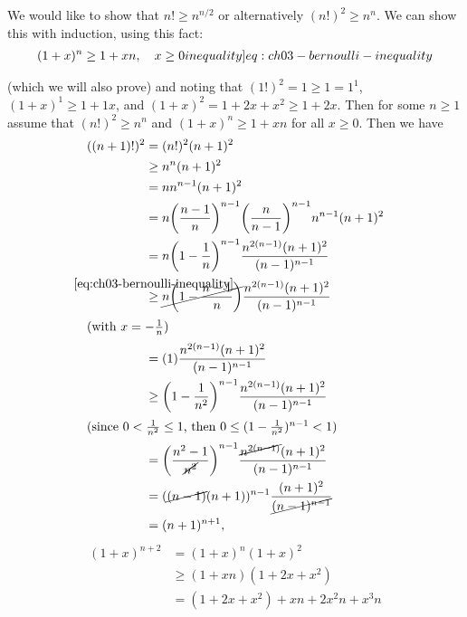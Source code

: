 \documentclass[Chapter03]{subfiles}
\begin{document}
\begin{enumerate}
\begin{answer}
			We would like to show that $n! \geq n^{n/2}$ or alternatively $(n!)^2 \geq n^n$. We can show this with induction, using this fact:
			\begin{align}
				(1 + x)^n \geq 1 + xn,\quad x \geq 0 \label[inequality]{eq:ch03-bernoulli-inequality}
			\end{align}

			  (which we will also prove) and noting that $(1!)^2 = 1 \geq 1 = 1^1$, $(1 + x)^1 \geq 1 + 1x$, and $(1 + x)^2 = 1 + 2x + x^2 \geq 1 + 2x$. Then for some $n \geq 1$ assume that $(n!)^2 \geq n^n$ and $(1 + x)^n \geq 1 + xn$ for all $x \geq 0$. Then we have
			\begin{align*}
				((n + 1)!)^2 &= (n!)^2 (n+1)^2\\
					&\geq n^n (n + 1)^2\\
					&= n n^{n - 1}(n + 1)^2\\
					&= n \qty(\frac{n - 1}{n})^{n - 1} \qty(\frac{n}{n - 1})^{n - 1} n^{n - 1}(n + 1)^2\\
					&= n \qty(1 - \frac{1}{n})^{n - 1} \frac{n^{2(n - 1)}(n + 1)^2}{(n - 1)^{n - 1}}\\
					&\overset{\mathclap{\eqref{eq:ch03-bernoulli-inequality}}}{\geq} \cancel{n \qty(1 - \frac{n - 1}{n})} \frac{n^{2(n - 1)}(n + 1)^2}{(n - 1)^{n - 1}}\\
				\shortintertext{(with $x = -\frac{1}{n}$)}
					&= (1) \frac{n^{2(n - 1)}(n + 1)^2}{(n - 1)^{n - 1}}\\
					&\geq \qty (1 - \frac{1}{n^2})^{n - 1} \frac{n^{2(n - 1)}(n + 1)^2}{(n - 1)^{n - 1}}\\
				\shortintertext{(since $0 < \frac{1}{n^2} \leq 1$, then $0 \leq (1 - \frac{1}{n^2})^{n - 1} < 1$)}
					&= \qty(\frac{n^2 - 1}{\cancel{n^2}})^{n - 1} \frac{\cancel{n^{2(n - 1)}}(n + 1)^2}{(n - 1)^{n - 1}}\\
					&= (\cancel{(n-1)}(n+1))^{n - 1} \frac{(n + 1)^2}{\cancel{(n - 1)^{n - 1}}}\\
					&= (n + 1)^{n + 1},
			\end{align*}
			\begin{align*}
				(1 + x)^{n + 2} &= (1 + x)^n(1 + x)^2\\
					&\geq (1 + xn) (1 + 2x + x^2)\\
					&= (1 + 2x + x^2) + xn + 2x^2n + x^3n\\

\end{align*}
\end{answer}
\end{enumerate}
\end{document}
